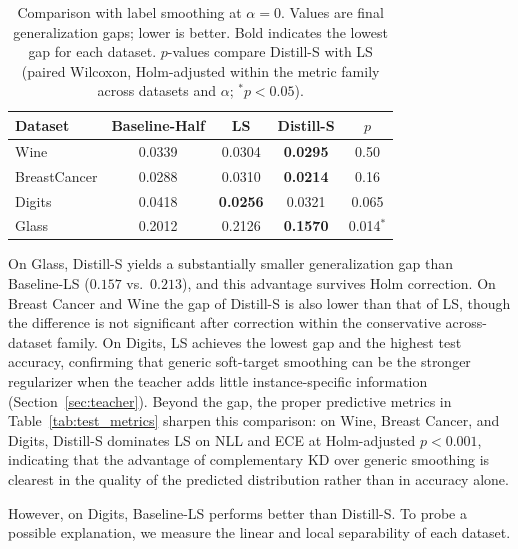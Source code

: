 \documentclass[a4paper,fleqn]{cas-dc}
\begin{document}
\begin{table}[b]
\centering
\caption{Comparison with label smoothing at $\alpha{=}0$. Values are final
         generalization gaps; lower is better. Bold indicates the lowest gap
         for each dataset. $p$-values compare Distill-S with LS (paired
         Wilcoxon, Holm-adjusted within the metric family across datasets
         and $\alpha$; $^{*}p{<}0.05$).}
\label{tab:ls_comparison}
\setlength{\tabcolsep}{6pt}
\begin{tabular}{lcccc}
\toprule
Dataset & Baseline-Half & LS & Distill-S & $p$ \\
\midrule
Wine         & 0.0339 & 0.0304 & \textbf{0.0295} & 0.50\\
BreastCancer & 0.0288 & 0.0310 & \textbf{0.0214} & 0.16\\
Digits       & 0.0418 & \textbf{0.0256} & 0.0321 & 0.065\\
Glass        & 0.2012 & 0.2126 & \textbf{0.1570} & 0.014$^{*}$ \\
\bottomrule
\end{tabular}
\end{table}

On Glass, Distill-S yields a substantially smaller generalization gap than
Baseline-LS ($0.157$ vs.\ $0.213$), and this advantage survives Holm
correction. On Breast Cancer and Wine the gap of Distill-S is also lower
than that of LS, though the difference is not significant after correction
within the conservative across-dataset family. On Digits, LS achieves the
lowest gap and the highest test accuracy, confirming that generic
soft-target smoothing can be the stronger regularizer when the teacher
adds little instance-specific information (Section~\ref{sec:teacher}).
Beyond the gap, the proper predictive metrics in
Table~\ref{tab:test_metrics} sharpen this comparison: on Wine, Breast
Cancer, and Digits, Distill-S dominates LS on NLL and ECE at
Holm-adjusted $p<0.001$, indicating that the advantage of complementary
KD over generic smoothing is clearest in the quality of the predicted
distribution rather than in accuracy alone.


However, on Digits, Baseline-LS performs better than Distill-S. To probe a possible explanation, we measure the linear and local separability of each dataset.
\end{document}
